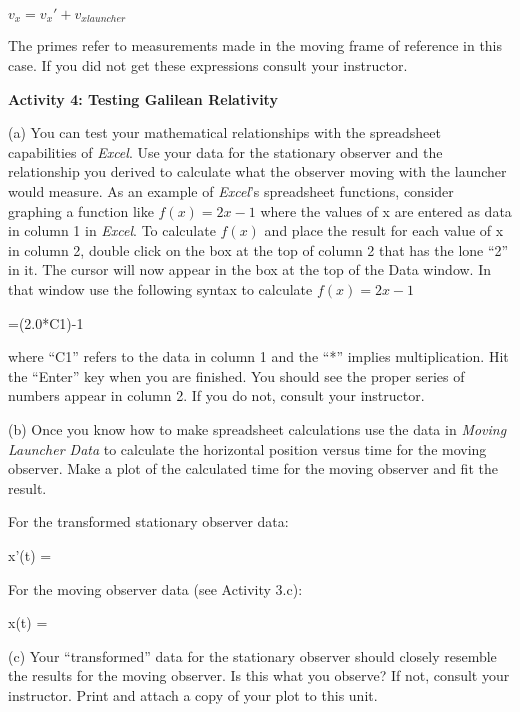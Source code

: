{\centering \( v_{x}=v_{x}'+v_{xlauncher} \)\par}

The primes refer to measurements made in the moving frame of reference
in this case. If you did not get these expressions consult your instructor.

\textbf{Activity 4: Testing Galilean Relativity}

(a) You can test your mathematical relationships with the spreadsheet
capabilities of \emph{Excel}. Use your data for the stationary
observer and the relationship you derived to calculate what the observer
moving with the launcher would measure. As an example of \emph{Excel}'s
spreadsheet functions, consider graphing a function like \( f(x)=2x-1 \)
where the values of x are entered as data in column 1 in \emph{Excel}.
To calculate \( f(x) \) and place the result for each value of x
in column 2, double click on the box at the top of column 2 that has
the lone {}``2'' in it. The cursor will now appear in the box at
the top of the Data window. In that window use the following syntax
to calculate \( f(x)=2x-1 \)

{\centering =(2.0{*}C1)-1\par}

where {}``C1'' refers to the data in column 1 and the {}``{*}''
implies multiplication. Hit the {}``Enter'' key when you are finished.
You should see the proper series of numbers appear in column 2. If
you do not, consult your instructor.

(b) Once you know how to make spreadsheet calculations use the data
in \emph{Moving Launcher Data} to calculate the horizontal position
versus time for the moving observer. Make a plot of the calculated
time for the moving observer and fit the result.

For the transformed stationary observer data:
\vspace{5mm}

\begin{LyXParagraphIndent}{0.05\columnwidth}
x'(t) =
\vspace{5mm}

\end{LyXParagraphIndent}

For the moving observer data (see Activity 3.c):
\vspace{5mm}

\begin{LyXParagraphIndent}{0.05\columnwidth}
x(t) =
\vspace{5mm}

\end{LyXParagraphIndent}

(c) Your {}``transformed'' data for the stationary observer should
closely resemble the results for the moving observer. Is this what
you observe? If not, consult your instructor. Print and attach a copy
of your plot to this unit.
